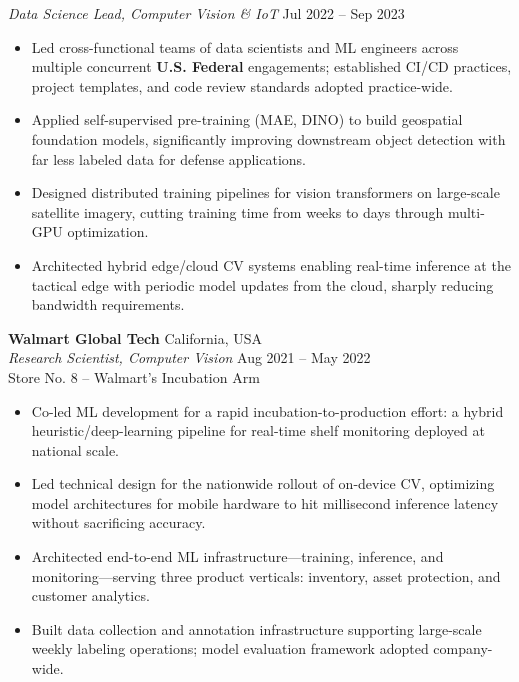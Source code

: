 \documentclass[11pt]{article}
\begin{document}
\textit{Data Science Lead, Computer Vision \& IoT} \hfill Jul 2022 -- Sep 2023
\begin{itemize}
    \item Led cross-functional teams of data scientists and ML engineers across multiple concurrent \textbf{U.S. Federal} engagements; established CI/CD practices, project templates, and code review standards adopted practice-wide.
    \item Applied self-supervised pre-training (MAE, DINO) to build geospatial foundation models, significantly improving downstream object detection with far less labeled data for defense applications.
    \item Designed distributed training pipelines for vision transformers on large-scale satellite imagery, cutting training time from weeks to days through multi-GPU optimization.
    \item Architected hybrid edge/cloud CV systems enabling real-time inference at the tactical edge with periodic model updates from the cloud, sharply reducing bandwidth requirements.
\end{itemize}

\vspace{0.2em}
\textbf{Walmart Global Tech} \hfill California, USA\\
\textit{Research Scientist, Computer Vision} \hfill Aug 2021 -- May 2022\\
Store No. 8 -- Walmart's Incubation Arm
\begin{itemize}
    \item Co-led ML development for a rapid incubation-to-production effort: a hybrid heuristic/deep-learning pipeline for real-time shelf monitoring deployed at national scale.
    \item Led technical design for the nationwide rollout of on-device CV, optimizing model architectures for mobile hardware to hit millisecond inference latency without sacrificing accuracy.
    \item Architected end-to-end ML infrastructure---training, inference, and monitoring---serving three product verticals: inventory, asset protection, and customer analytics.
    \item Built data collection and annotation infrastructure supporting large-scale weekly labeling operations; model evaluation framework adopted company-wide.
\end{itemize}
\end{document}
